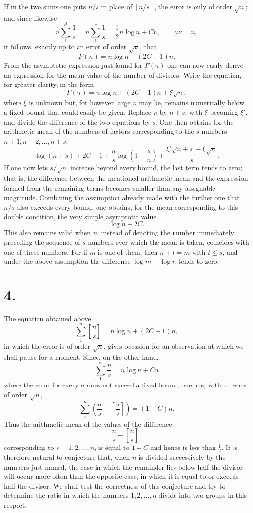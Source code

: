 \documentclass[11pt]{article}
\newcommand{\floor}[1]{\left[#1\right]}
\begin{document}
If in the two sums one puts $n/s$ in place of $\floor{n/s}$, the error is only of order $\sqrt n$; and since likewise
\[
 n\sum_{1}^{\mu}\frac1s=n\sum_{1}^{\nu}\frac1s=\frac12 n\log n+Cn,
 \qquad \mu\nu=n,
\]
it follows, exactly up to an error of order $\sqrt n$, that
\[
 F(n)=n\log n+(2C-1)n.
\]
From the asymptotic expression just found for $F(n)$ one can now easily derive an expression for the mean value of the number of divisors. Write the equation, for greater clarity, in the form
\[
 F(n)=n\log n+(2C-1)n+\xi\sqrt n,
\]
where $\xi$ is unknown but, for however large $n$ may be, remains numerically below a fixed bound that could easily be given. Replace $n$ by $n+s$, with $\xi$ becoming $\xi'$, and divide the difference of the two equations by $s$. One then obtains for the arithmetic mean of the numbers of factors corresponding to the $s$ numbers $n+1,n+2,\ldots,n+s$:
\[
 \log(n+s)+2C-1+\frac ns\log\left(1+\frac sn\right)
 +\frac{\xi'\sqrt{n+s}-\xi\sqrt n}{s}.
\]
If one now lets $s/\sqrt n$ increase beyond every bound, the last term tends to zero; that is, the difference between the mentioned arithmetic mean and the expression formed from the remaining terms becomes smaller than any assignable magnitude. Combining the assumption already made with the further one that $n/s$ also exceeds every bound, one obtains, for the mean corresponding to this double condition, the very simple asymptotic value
\[
 \log n+2C.
\]
This also remains valid when $n$, instead of denoting the number immediately preceding the sequence of $s$ numbers over which the mean is taken, coincides with one of these numbers. For if $m$ is one of them, then $n+t=m$ with $t\leq s$, and under the above assumption the difference $\log m-\log n$ tends to zero.

\section*{4.}

The equation obtained above,
\[
 \sum_{1}^{n}\floor{\frac ns}=n\log n+(2C-1)n,
\]
in which the error is of order $\sqrt n$, gives occasion for an observation at which we shall pause for a moment. Since, on the other hand,
\[
 \sum_{1}^{n}\frac ns=n\log n+Cn
\]
where the error for every $n$ does not exceed a fixed bound, one has, with an error of order $\sqrt n$,
\[
 \sum_{1}^{n}\left(\frac ns-\floor{\frac ns}\right)=(1-C)n.
\]
Thus the arithmetic mean of the values of the difference
\[
 \frac ns-\floor{\frac ns},
\]
corresponding to $s=1,2,\ldots,n$, is equal to $1-C$ and hence is less than $\tfrac12$. It is therefore natural to conjecture that, when $n$ is divided successively by the numbers just named, the case in which the remainder lies below half the divisor will occur more often than the opposite case, in which it is equal to or exceeds half the divisor. We shall test the correctness of this conjecture and try to determine the ratio in which the numbers $1,2,\ldots,n$ divide into two groups in this respect.
\end{document}
